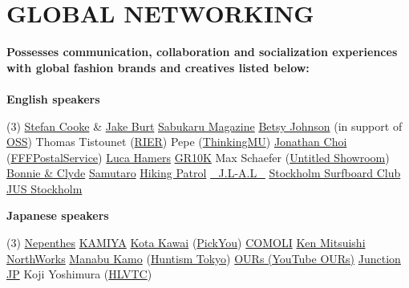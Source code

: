 \documentclass[a4paper,10pt]{extarticle}
\begin{document}
\section*{GLOBAL NETWORKING}
\textbf{Possesses communication, collaboration and socialization experiences with global fashion brands and creatives listed below:}\\\\
\noindent
{\textbf{English speakers}}
\begin{tasks}[style=itemize](3)
	\task \href{https://instagram.com/stefan_cooke}{Stefan Cooke} \& \href{https://instagram.com/jakewkburt}{Jake Burt}
	\task \href{https://instagram.com/sabukaruonline}{Sabukaru Magazine}
	\task \href{https://instagram.com/betsyjohnson_}{Betsy Johnson} (in support of \href{https://instagram.com/ourspecialsupport}{OSS})
	\task Thomas Tistounet (\href{https://instagram.com/rierofficial}{RIER})
	\task Pepe (\href{https://instagram.com/thinkingmu}{ThinkingMU})
	\task \href{https://instagram.com/jccchurro}{Jonathan Choi} (\href{https://instagram.com/fffpostalservice}{FFFPostalService})
	\task \href{https://instagram.com/lucahamers}{Luca Hamers}
	\task \href{https://instagram.com/gr10k}{GR10K}
	\task Max Schaefer (\href{https://instagram.com/untitled.paris}{Untitled Showroom})
	\task \href{https://instagram.com/bonnieclyde}{Bonnie \& Clyde}
	\task \href{https://instagram.com/samutaro}{Samutaro}
	\task \href{https://instagram.com/hikingpatrol}{Hiking Patrol}
	\task \href{https://instagram.com/_j.l_a.l_}{\_J.L-A.L\_}
	\task \href{https://instagram.com/stockholmsurfboardclub}{Stockholm Surfboard Club}
	\task \href{https://instagram.com/jus_sthlm}{JUS Stockholm}
\end{tasks}

\noindent
{\textbf{Japanese speakers}}
\begin{tasks}[style=itemize](3)
	\task \href{https://instagram.com/nepenthes.official}{Nepenthes}
	\task \href{https://instagram.com/kamiya___official}{KAMIYA}
	\task \href{https://www.instagram.com/_kotakawai/}{Kota Kawai} (\href{https://instagram.com/pickyou.app}{PickYou})
	\task \href{https://instagram.com/comoli_archive}{COMOLI}
	\task \href{https://instagram.com/kenmitsuishi_official}{Ken Mitsuishi}
	\task \href{https://instagram.com/northworksfolk}{NorthWorks}
	\task \href{https://instagram.com/mr13brain}{Manabu Kamo} (\href{https://instagram.com/huntism_tokyo}{Huntism Tokyo})
	\task \href{https://www.youtube.com/@OURs8888}{OURs (YouTube OURs)}
	\task \href{https://www.instagram.com/junction.jp_kr/}{Junction JP}
	\task Koji Yoshimura (\href{https://www.instagram.com/hlvtc.jp/}{HLVTC})
\end{tasks}
\end{document}
